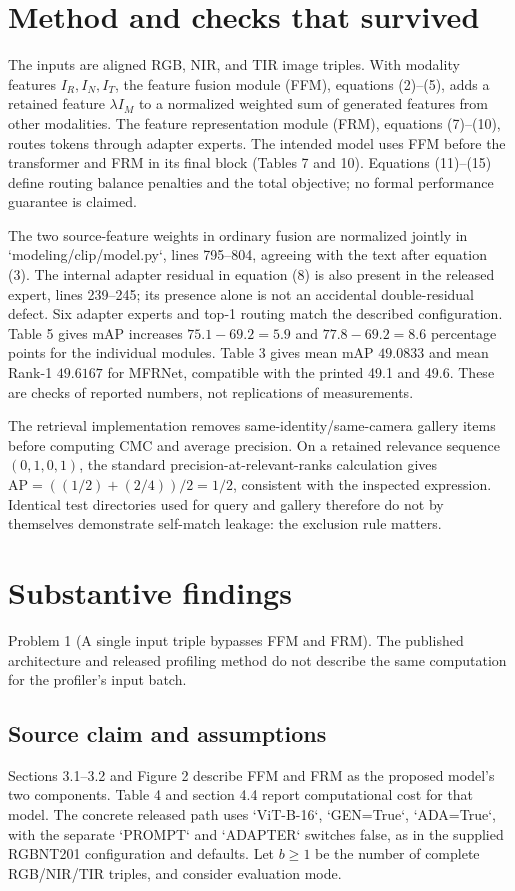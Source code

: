 \documentclass[10pt]{article}
\begin{document}
\section*{Method and checks that survived}
The inputs are aligned RGB, NIR, and TIR image triples. With modality features \(I_R,I_N,I_T\), the feature fusion module (FFM), equations (2)–(5), adds a retained feature \(\lambda I_M\) to a normalized weighted sum of generated features from other modalities. The feature representation module (FRM), equations (7)–(10), routes tokens through adapter experts. The intended model uses FFM before the transformer and FRM in its final block (Tables 7 and 10). Equations (11)–(15) define routing balance penalties and the total objective; no formal performance guarantee is claimed.\par
The two source-feature weights in ordinary fusion are normalized jointly in `modeling/clip/model.py`, lines 795–804, agreeing with the text after equation (3). The internal adapter residual in equation (8) is also present in the released expert, lines 239–245; its presence alone is not an accidental double-residual defect. Six adapter experts and top-1 routing match the described configuration. Table 5 gives mAP increases \(75.1-69.2=5.9\) and \(77.8-69.2=8.6\) percentage points for the individual modules. Table 3 gives mean mAP \(49.0833\) and mean Rank-1 \(49.6167\) for MFRNet, compatible with the printed 49.1 and 49.6. These are checks of reported numbers, not replications of measurements.\par
The retrieval implementation removes same-identity/same-camera gallery items before computing CMC and average precision. On a retained relevance sequence \((0,1,0,1)\), the standard precision-at-relevant-ranks calculation gives \(\mathrm{AP}=((1/2)+(2/4))/2=1/2\), consistent with the inspected expression. Identical test directories used for query and gallery therefore do not by themselves demonstrate self-match leakage: the exclusion rule matters.\par
\section*{Substantive findings}
Problem 1 (A single input triple bypasses FFM and FRM).  The published architecture and released profiling method do not describe the same computation for the profiler’s input batch.\par
\subsection*{Source claim and assumptions}
Sections 3.1–3.2 and Figure 2 describe FFM and FRM as the proposed model’s two components. Table 4 and section 4.4 report computational cost for that model. The concrete released path uses `ViT-B-16`, `GEN=True`, `ADA=True`, with the separate `PROMPT` and `ADAPTER` switches false, as in the supplied RGBNT201 configuration and defaults. Let \(b\geq1\) be the number of complete RGB/NIR/TIR triples, and consider evaluation mode.\par
\end{document}
